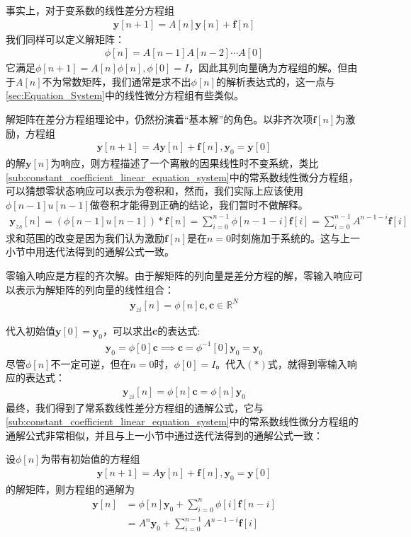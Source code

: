 事实上，对于变系数的线性差分方程组\begin{align*}
    \mathbf{y}[n+1] = A[n] \mathbf{y}[n]+ \mathbf{f}[n]
\end{align*}
我们同样可以定义解矩阵：
\begin{align*}
    \phi[n] = A[n-1] A[n-2] \cdots A[0]
\end{align*}
它满足$\phi[n+1] = A[n] \phi[n],\phi[0] = I$，因此其列向量确为方程组的解。但由于$A[n]$不为常数矩阵，我们通常是求不出$\phi[n]$的解析表达式的，这一点与\ref{sec:Equation_System}中的线性微分方程组有些类似。

解矩阵在差分方程组理论中，仍然扮演着“基本解”的角色。以非齐次项$\mathbf{f}[n]$为激励，方程组\begin{align*}
    \mathbf{y}[n+1] = A \mathbf{y}[n] + \mathbf{f}[n],\mathbf{y}_0 = \mathbf{y}[0]
\end{align*}
的解$\mathbf{y}[n]$为响应，则方程描述了一个离散的因果线性时不变系统，类比\ref{sub:constant_coefficient_linear_equation_system}中的常系数线性微分方程组，可以猜想零状态响应可以表示为卷积和，然而，我们实际上应该使用$\phi[n-1]u[n-1]$做卷积才能得到正确的结论，我们暂时不做解释。\begin{align*}
    \mathbf{y}_{zs}[n] = (\phi[n-1]u[n-1]) * \mathbf{f}[n]=\sum_{i=0}^{n-1} \phi[n-1-i]\mathbf{f}[i]=\sum_{i=0}^{n-1} A^{n-1-i} \mathbf{f}[i]
\end{align*}
求和范围的改变是因为我们认为激励$\mathbf{f}[n]$是在$n=0$时刻施加于系统的。这与上一小节中用迭代法得到的通解公式一致。

零输入响应是方程的齐次解。由于解矩阵的列向量是差分方程的解，零输入响应可以表示为解矩阵的列向量的线性组合：\begin{align*}
    \mathbf{y}_{zi}[n] = \phi[n]\mathbf{c},\mathbf{c}\in\mathbb{R}^N\tag{$*$}
\end{align*}

代入初始值$\mathbf{y}[0]=\mathbf{y}_0$，可以求出$\mathbf{c}$的表达式:
\begin{align*}
    \mathbf{y}_0 = \phi[0]\mathbf{c}\implies \mathbf{c} = \phi^{-1}[0]\mathbf{y}_0 = \mathbf{y}_0
\end{align*}
尽管$\phi[n]$不一定可逆，但在$n=0$时，$\phi[0]=I$。代入$(*)$式，就得到零输入响应的表达式：
\begin{align*}
    \mathbf{y}_{zi}[n] = \phi[n]\mathbf{c} = \phi[n]\mathbf{y}_0
\end{align*}
最终，我们得到了常系数线性差分方程组的通解公式，它与\ref{sub:constant_coefficient_linear_equation_system}中的常系数线性微分方程组的通解公式非常相似，并且与上一小节中通过迭代法得到的通解公式一致：
\begin{theorem}
    设$\phi[n]$为带有初始值的方程组\begin{align*}
        \mathbf{y}[n+1] = A \mathbf{y}[n]+\mathbf{f}[n],\mathbf{y}_0 = \mathbf{y}[0]
    \end{align*}
    的解矩阵，则方程组的通解为\begin{align*}
        \mathbf{y}[n]& = \phi[n]\mathbf{y}_0 + \sum_{i=0}^{n} \phi[i]\mathbf{f}[n-i]\\
        & = A^n \mathbf{y}_0 + \sum_{i=0}^{n-1} A^{n-1-i} \mathbf{f}[i]
    \end{align*}
\end{theorem}

